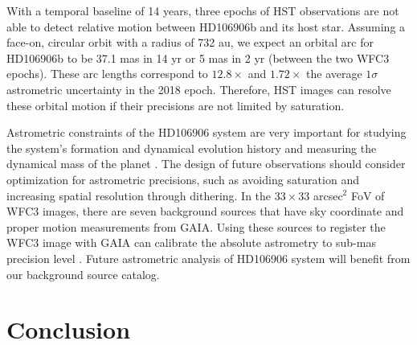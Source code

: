 \documentclass[twocolumn]{aastex62}
\begin{document}
With a temporal baseline of 14 years, three epochs of HST observations are not able to detect relative motion between HD106906b and its host star. Assuming a face-on, circular orbit with a radius of 732 au, we expect an orbital arc for HD106906b to be 37.1 mas in 14 yr or 5 mas in 2 yr (between the two WFC3 epochs). These arc lengths correspond to $12.8\times$ and $1.72\times$ the average $1\sigma$ astrometric uncertainty in the 2018 epoch. Therefore, HST images can resolve these orbital motion if their precisions are not limited by saturation.

Astrometric constraints of the HD106906 system are very important for studying the system's formation and dynamical evolution history \citep[e.g., ][]{DeRosa2019} and measuring the dynamical mass of the planet \citep[e.g.,][]{Snellen2018,Dupuy2019}. The design of future observations should consider optimization for astrometric precisions, such as avoiding saturation and increasing spatial resolution through dithering. In the $33\times33$ arcsec$^{2}$ FoV of WFC3 images, there are seven background sources that have sky coordinate and proper motion measurements from GAIA. Using these sources to register the WFC3 image with GAIA can calibrate the absolute astrometry to sub-mas precision level \citep{Bedin2018}. Future astrometric analysis of HD106906 system will  benefit from our background source catalog.

\section{Conclusion}
\end{document}
